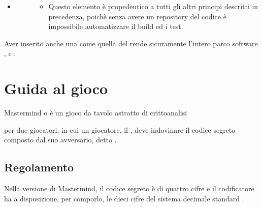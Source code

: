 \documentclass[letterpaper,10pt,italian,openany,oneside]{sphinxmanual}
\begin{document}
\begin{itemize}
\begin{description}
\end{description}

\item {} \begin{description}
\item[{}] \leavevmode\begin{itemize}
\item {} 
Questo elemento è propedeutico a tutti gli altri principi descritti in precedenza, poichè senza avere un repository del codice è impossibile automatizzare il build ed i test.

\end{itemize}

\end{description}

\end{itemize}

Aver inserito anche una  come quella del  rende sicuramente l’intero parco software ,  e .


\chapter{Guida al gioco}
\label{\detokenize{gameguide:guida-al-gioco}}\label{\detokenize{gameguide::doc}}
Mastermind o  è un gioco da tavolo astratto di crittoanalisi %
\begin{footnote}[1]\sphinxAtStartFootnote
{}
%
\end{footnote} per due giocatori, in cui un giocatore, il ,
deve indovinare il codice segreto composto dal suo avversario, detto .


\section{Regolamento}
\label{\detokenize{gameguide:regolamento}}
Nella versione  di Mastermind, il codice segreto è di quattro cifre e il codificatore ha a disposizione, per comporlo, le dieci cifre del sistema decimale standard .
\end{document}
